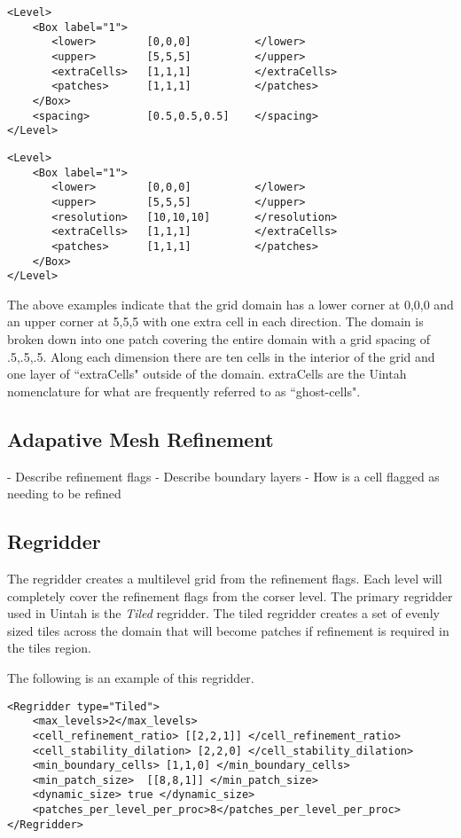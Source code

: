 \begin{Verbatim}[fontsize=\footnotesize]
<Level>
    <Box label="1">
       <lower>        [0,0,0]          </lower>
       <upper>        [5,5,5]          </upper>
       <extraCells>   [1,1,1]          </extraCells>
       <patches>      [1,1,1]          </patches>
    </Box>
    <spacing>         [0.5,0.5,0.5]    </spacing>
</Level>
\end{Verbatim}
\begin{Verbatim}[fontsize=\footnotesize]
<Level>
    <Box label="1">
       <lower>        [0,0,0]          </lower>
       <upper>        [5,5,5]          </upper>
       <resolution>   [10,10,10]       </resolution>
       <extraCells>   [1,1,1]          </extraCells>
       <patches>      [1,1,1]          </patches>
    </Box>
</Level>
\end{Verbatim}


The above examples indicate that the grid domain has a lower corner at
0,0,0 and an upper corner at 5,5,5 with one extra cell in each
direction.  The domain is broken down into one patch covering the
entire domain with a grid spacing of .5,.5,.5.  Along each dimension
there are ten cells in the interior of the grid and one layer of
``extraCells" outside of the domain.  extraCells are the Uintah nomenclature
for what are frequently referred to as ``ghost-cells".

%
\subsection{Adapative Mesh Refinement}
- Describe refinement flags
- Describe boundary layers
- How is a cell flagged as needing to be refined
%
\subsection{Regridder}

The regridder creates a multilevel grid from the refinement flags.
Each level will completely cover the refinement flags from the corser
level.  The primary regridder used in Uintah is the \emph{Tiled} regridder.
The tiled regridder creates a set of evenly sized tiles across the domain
that will become patches if refinement is required in the tiles region.

The following is an example of this regridder.

\begin{Verbatim}     
<Regridder type="Tiled">   
    <max_levels>2</max_levels>
    <cell_refinement_ratio> [[2,2,1]] </cell_refinement_ratio>
    <cell_stability_dilation> [2,2,0] </cell_stability_dilation>
    <min_boundary_cells> [1,1,0] </min_boundary_cells>
    <min_patch_size>  [[8,8,1]] </min_patch_size>
    <dynamic_size> true </dynamic_size>      
    <patches_per_level_per_proc>8</patches_per_level_per_proc>   
</Regridder>
\end{Verbatim}

